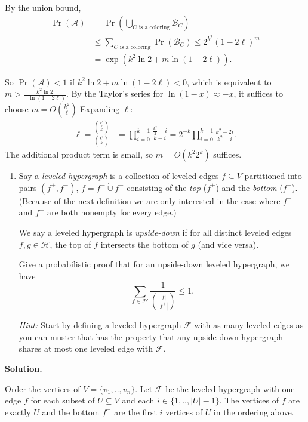 \documentclass[11pt,letterpaper]{article}
\theoremstyle{definition}
\newcommand{\calA}{\mathcal{A}}
\newcommand{\calB}{\mathcal{B}}
\newcommand{\calF}{\mathcal{F}}
\newcommand{\calH}{\mathcal{H}}
\newcommand{\solution}{\medskip\noindent\textbf{Solution.}\par\medskip}
\begin{document}
By the union bound,
\begin{align*}
    \Pr(\calA) &= \Pr\left(\bigcup_{C \text{ is a coloring}}\calB_C\right) \\
    &\leq \sum_{C \text{ is a coloring}}\Pr\left(\calB_C\right)\leq 2^{k^2}\left(1-2\ell\right)^m \\
    &= \exp\left(k^2\ln 2 + m\ln(1-2\ell)\right).
\end{align*}

So $\Pr(\calA)<1$ if $k^2\ln 2 + m\ln(1-2\ell)<0$, which is equivalent to $m > \frac{k^2\ln 2}{-\ln(1-2\ell)}$.
By the Taylor's series for $\ln(1-x)\approx -x$, it suffices to choose $m = O(\frac{k^2}{\ell})$
Expanding $\ell$:
\begin{align*}
    \ell = \frac{\binom{\frac{k^2}{2}}{k}}{\binom{k^2}{k}} &=\prod_{i=0}^{k-1}\frac{\frac{k^2}{2}-i}{k-i}=2^{-k}\prod_{i=0}^{k-1}\frac{k^2-2i}{k^2-i}.
\end{align*}
The additional product term is small, so $m=O(k^2 2^k)$ suffices.

\begin{enumerate}[resume]
\item Say a \emph{leveled hypergraph} is a collection of leveled edges $f\subseteq V$ partitioned into pairs $(f^+,f^-)$, $f = f^+\mathbin{\dot{\cup}}f^-$ consisting of the \emph{top} ($f^+$) and the \emph{bottom} ($f^-$). (Because of the next definition we are only interested in the case where $f^+$ and $f^-$ are both nonempty for every edge.)

We say a leveled hypergraph is \emph{upside-down} if for all distinct leveled edges $f,g\in\calH$, the top of $f$ intersects the bottom of $g$ (and vice versa).

Give a probabilistic proof that for an upside-down leveled hypergraph, we have
\[
\sum_{f\in\calH}\frac{1}{\binom{|f|}{|f^+|}} \leq 1.
\]

\emph{Hint:} Start by defining a leveled hypergraph $\calF$ with as many leveled edges as you can muster that has the property that any upside-down hypergraph shares at most one leveled edge with $\calF$.
\end{enumerate}

\solution

Order the vertices of $V = \{v_1,.., v_n\}$.
Let $\calF$ be the leveled hypergraph with one edge $f$ for each subset of $U\subseteq V$ and each $i\in \{1,..,|U|-1\}$. 
The vertices of $f$ are exactly $U$ and the bottom $f^-$ are the first $i$ vertices of $U$ in the ordering above.
\end{document}
